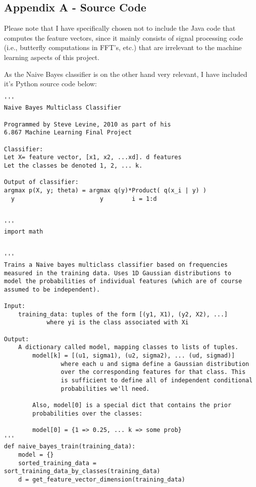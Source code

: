 \documentclass[aps,twocolumn,secnumarabic,balancelastpage,amsmath,amssymb,nofootinbib]{revtex4-1}
\begin{document}
	
\pagebreak 
\begin{widetext}
\section*{Appendix A - Source Code}
Please note that I have specifically chosen not to include the Java code that computes the feature vectors, since it mainly consists of signal processing code (i.e., butterfly computations in FFT's, etc.) that are irrelevant to the machine learning aspects of this project.

As the Naive Bayes classifier is on the other hand very relevant, I have included it's Python source code below: 

\begin{verbatim}
'''
Naive Bayes Multiclass Classifier

Programmed by Steve Levine, 2010 as part of his
6.867 Machine Learning Final Project

Classifier:
Let X= feature vector, [x1, x2, ...xd]. d features
Let the classes be denoted 1, 2, ... k.

Output of classifier:
argmax p(X, y; theta) = argmax q(y)*Product( q(x_i | y) )
  y                        y        i = 1:d


'''
import math


'''
Trains a Naive bayes multiclass classifier based on frequencies
measured in the training data. Uses 1D Gaussian distributions to
model the probabilities of individual features (which are of course
assumed to be independent).

Input:
    training_data: tuples of the form [(y1, X1), (y2, X2), ...]
            where yi is the class associated with Xi

Output:
    A dictionary called model, mapping classes to lists of tuples.
        model[k] = [(u1, sigma1), (u2, sigma2), ... (ud, sigmad)]
                where each u and sigma define a Gaussian distribution
                over the corresponding features for that class. This
                is sufficient to define all of independent conditional
                probabilities we'll need.

        Also, model[0] is a special dict that contains the prior
        probabilities over the classes:

        model[0] = {1 => 0.25, ... k => some prob}
'''
def naive_bayes_train(training_data):
    model = {}
    sorted_training_data = sort_training_data_by_classes(training_data)
    d = get_feature_vector_dimension(training_data)


\end{verbatim}
\end{widetext}
\end{document}
